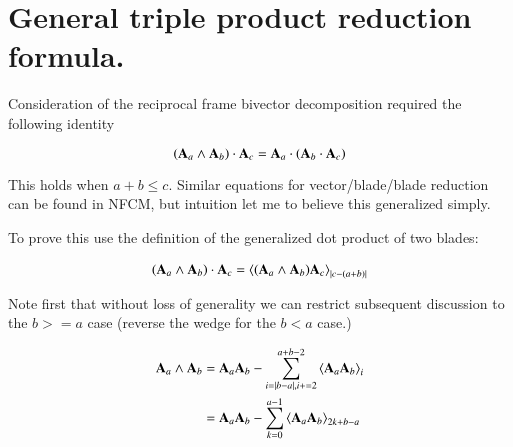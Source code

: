 \documentclass{article}      %
\title{} %
\author{Peeter Joot}         %
\newcommand{\gpgrade}[2] {{\left\langle{{#1}}\right\rangle}_{#2}}
\begin{document}

\maketitle{}

\section{ General triple product reduction formula. }

Consideration of the reciprocal frame bivector decomposition required the following identity

\begin{equation}
(\mathbf{A}_a \wedge \mathbf{A}_b) \cdot \mathbf{A}_c =
\mathbf{A}_a \cdot (\mathbf{A}_b \cdot \mathbf{A}_c)
\end{equation}

This holds when $a + b \le c$.  Similar equations for vector/blade/blade reduction can be found in NFCM, but intuition let me to believe this generalized simply.

To prove this use the definition of the generalized dot product of two blades:

\begin{align*}
(\BA_a \wedge \BA_b) \cdot \BA_c
&= \gpgrade{ (\BA_a \wedge \BA_b) \BA_c }{\abs{c-(a+b)}} \\
\end{align*}

%
%
%
%

Note first that without loss of generality we can restrict subsequent discussion 
to the $b >= a$ case (reverse the wedge for the $b < a$ case.)

\begin{align*}\label{eqn:bladewedge}
\BA_a \wedge \BA_b 
&= \BA_a \BA_b - \sum_{i=\abs{b-a},i+=2}^{a+b-2}\gpgrade{\BA_a\BA_b}{i} \\
&= \BA_a \BA_b - \sum_{k=0}^{a-1}\gpgrade{\BA_a\BA_b}{2k + b - a} \\
\end{align*}
\end{document}
